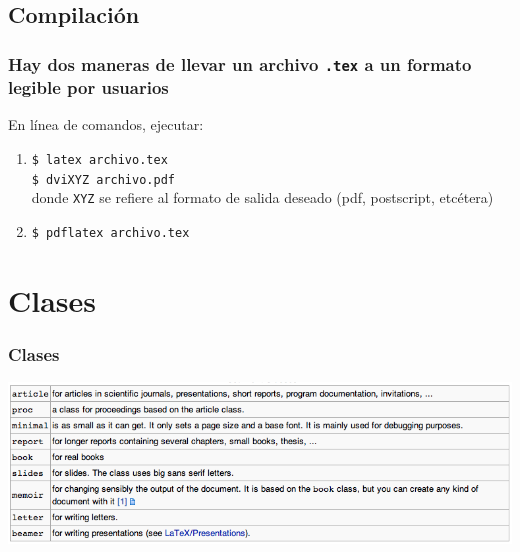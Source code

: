 \documentclass{beamer} %
\begin{document}
\subsection{Compilación}

\begin{frame}
  \frametitle{Hay dos maneras de llevar un archivo \texttt{.tex} a un formato legible por usuarios}
  En línea de comandos, ejecutar:
  \begin{enumerate}
  \item \texttt{\$ latex archivo.tex}\\
    \texttt{\$ dviXYZ archivo.pdf}\\
    donde \texttt{XYZ} se refiere al formato de salida deseado (pdf, postscript, etcétera) 
  \item \texttt{\$ pdflatex archivo.tex}
  \end{enumerate}
\end{frame}

\section{Clases}

\begin{frame}
  \frametitle{Clases}
  \begin{flushleft}
    \includegraphics[scale=0.45]{classes}
  \end{flushleft}
\end{frame}
\end{document}
